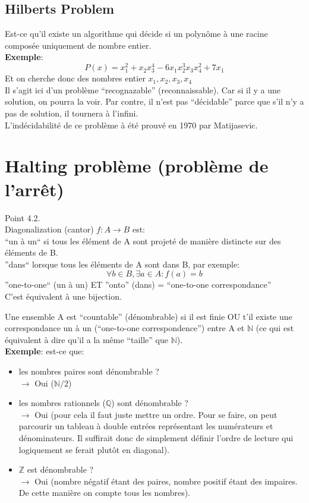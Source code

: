 \documentclass[a4paper,12pt]{article}
\begin{document}
  \subsection{Hilberts Problem}
    Est-ce qu'il existe un algorithme qui décide si un polynôme à une racine composée uniquement de nombre entier.\\
    \textbf{Exemple}:
    $$P(x) = x_1^2 + x_2 x_3^4 - 6 x_1 x_2^3 x_3 x_4^2 + 7 x_1$$
    Et on cherche donc des nombres entier $x_1, x_2, x_3, x_4$\\
    
    Il s'agit ici d'un problème ``recognazable'' (reconnaissable).  Car si il y a une solution, on pourra la voir.  Par contre, il n'est pas ``décidable'' parce que s'il n'y a pas de solution, il tournera à l'infini.\\
    
    L'indécidabilité de ce problème à été prouvé en 1970 par Matijasevic.
  
\section{Halting problème (problème de l'arrêt)}
  Point 4.2.\\
  Diagonalization (cantor)
  $f: A \rightarrow B$ est:\\
  ``un à un`` si tous les élément de A sont projeté de manière distincte sur des éléments de B.\\
  ''dans`` lorsque tous les éléments de A sont dans B, par exemple:\\
  $$\forall b \in B, \exists a \in A : f(a) = b$$
  ''one-to-one`` (un à un) ET ''onto'' (dans) = ``one-to-one correspondance''\\
  C'est équivalent à une bijection.
  
  Une ensemble A est ``countable'' (dénombrable) si il est finie OU t'il existe une correspondance un à un (``one-to-one correspondence'') entre A et $\mathbb{N}$ (ce qui est équivalent à dire qu'il a la même ``taille'' que $\mathbb{N}$).\\
  \textbf{Exemple}: est-ce que:
  \begin{itemize}
    \item les nombres paires sont dénombrable ?\\
      $\rightarrow$ Oui ($\mathbb{N} / 2$)
      
    \item les nombres rationnels ($\mathbb{Q}$) sont dénombrable ?\\
      $\rightarrow$ Oui (pour cela il faut juste mettre un ordre.  Pour se faire, on peut parcourir un tableau à double entrées représentant les numérateurs et dénominateurs. Il suffirait donc de simplement définir l'ordre de lecture qui logiquement se ferait plutôt en diagonal).
      
    \item $\mathbb{Z}$ est dénombrable ?\\
      $\rightarrow$ Oui (nombre négatif étant des paires, nombre positif étant des impaires. De cette manière on compte tous les nombres).
  \end{itemize}
\end{document}
